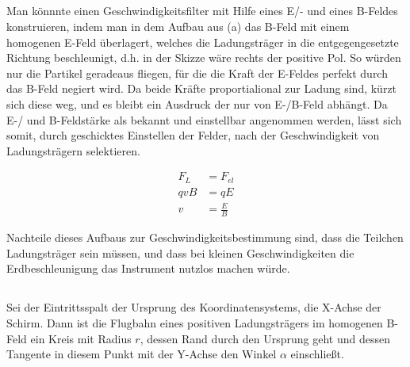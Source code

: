 \documentclass[11pt]{article}
\begin{document}
\subsection{}
\begin{adjustwidth}{20pt}{}
    Man könnnte einen Geschwindigkeitsfilter mit Hilfe eines E/- und eines B-Feldes
    konstruieren, indem man in dem Aufbau aus (a) das B-Feld mit einem 
    homogenen E-Feld überlagert, welches die Ladungsträger in die entgegengesetzte Richtung 
    beschleunigt, d.h. in der Skizze wäre rechts der positive Pol.
    So würden nur die Partikel geradeaus fliegen, für die die Kraft der E-Feldes 
    perfekt durch das B-Feld negiert wird. Da beide Kräfte proportialional
    zur Ladung sind, kürzt sich diese weg, und es bleibt ein Ausdruck 
    der nur von E-/B-Feld abhängt. Da 
    E-/ und B-Feldstärke als bekannt und einstellbar angenommen werden,
    lässt sich somit, durch geschicktes Einstellen der Felder, nach der Geschwindigkeit 
    von Ladungsträgern selektieren. 
\end{adjustwidth}
\begin{align*}
    F_L &= F_{el}\\
    q v B &= q E\\
    v &= \frac{E}{B}
\end{align*}
\begin{adjustwidth}{20pt}{}
    Nachteile dieses Aufbaus zur Geschwindigkeitsbestimmung sind, dass die Teilchen 
    Ladungsträger sein müssen, und dass bei kleinen Geschwindigkeiten 
    die Erdbeschleunigung das Instrument nutzlos machen würde.
\end{adjustwidth}

\subsection{}
\begin{adjustwidth}{20pt}{}
    Sei der Eintrittsspalt der Ursprung des Koordinatensystems, die X-Achse der Schirm.
    Dann ist die Flugbahn eines positiven Ladungsträgers im homogenen B-Feld
    ein Kreis mit Radius $r$, dessen Rand durch den Ursprung geht und dessen Tangente
    in diesem Punkt mit der Y-Achse den Winkel $\alpha$ einschließt.
\end{adjustwidth}
\end{document}
